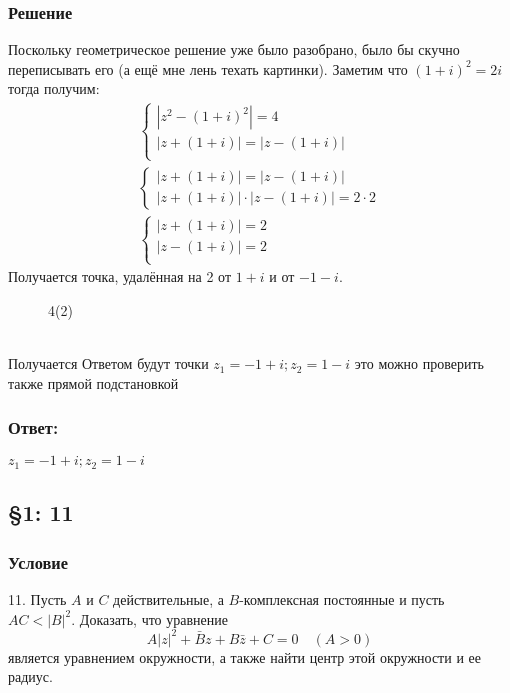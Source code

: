 \documentclass{article}
\begin{document}
\subsubsection*{Решение}
Поскольку геометрическое решение уже было разобрано, было бы скучно переписывать его (а ещё мне лень техать картинки). Заметим что $(1+i)^2 = 2i$ тогда получим:
\begin{gather*}
    \begin{cases}
        |z^2-(1+i)^2|=4\\
        |z+(1+i)|=|z-(1+i)|\\
    \end{cases}\\
    \begin{cases}
        |z+(1+i)|=|z-(1+i)|\\
        |z + (1 + i)| \cdot |z - (1+i)| = 2 \cdot 2
    \end{cases}\\
    \begin{cases}
        |z + (1 + i)| =2\\
         |z - (1+i)| = 2\\
    \end{cases}
\end{gather*}
Получается точка, удалённая на 2 от $1+i$ и от $-1-i$. 
\begin{figure}[h!]
\caption{4(2)}
\label{fig:4(2)}
\end{figure} \\
Получается Ответом будут точки $z_1=-1+i; z_2 = 1-i$ это можно проверить также прямой подстановкой
\subsubsection*{Ответ:}
$z_1=-1+i; z_2 = 1-i$                       

\subsection{\S1: 11}
\subsubsection*{Условие}
11. Пусть $A$ и $C$ действительные, а $B$-комплексная постоянные и пусть $A C<|B|^{2} .$ Доказать, что уравнение
$$
A|z|^{2}+\bar{B} z+B \bar{z}+C=0 \quad(A>0)
$$
является уравнением окружности, а также найти центр этой окружности и ее радиус.
\end{document}
